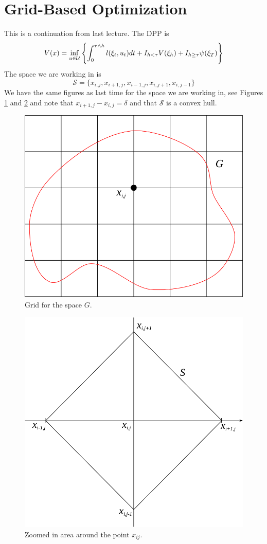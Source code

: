 
\mainmatter
\setcounter{page}{1}

\lectureseries[\course]{\course}

\date{December 1, 2009}

\setaddress

\setcounter{lecture}{16}
\setcounter{chapter}{16}


\section{Grid-Based Optimization}
This is a continuation from last lecture. The DPP is
$$V(x) = \inf_{u\in\mathcal{U}}\left\lbrace \int_0^{\tau\wedge h}l(\xi_t,u_t)dt + I_{h<\tau}V(\xi_h) + I_{h\geq\tau}\psi(\xi_T) \right\rbrace$$
The space we are working in is
$$\mathcal{S} = \{x_{i,j}, x_{i+1,j}, x_{i-1,j}, x_{i,j+1}, x_{i,j-1}\}$$
We have the same figures as last time for the space we are working in, see Figures \ref{fig:17grid} and \ref{fig:17x} and note that $x_{i+1,j}-x_{i,j}=\delta$ and that $\mathcal{S}$ is a convex hull.

\begin{figure}[ht!]
	\centering
	\includegraphics[width=.4\textwidth]{images/16grid}
	\caption{Grid for the space $G$.}
	\label{fig:17grid}
\end{figure}

\begin{figure}[ht!]
	\centering
	\includegraphics[width=.4\textwidth]{images/16x}
	\caption{Zoomed in area around the point $x_{ij}$.}
	\label{fig:17x}
\end{figure}

